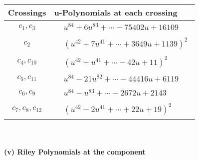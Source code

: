 \documentclass[1p]{elsarticle_modified}
\theoremstyle{definition}
\begin{document}
\begin{tabular}{m{50pt}|m{274pt}}
Crossings & \hspace{64pt}u-Polynomials at each crossing \\
\hline $$\begin{aligned}c_{1},c_{3}\end{aligned}$$&$\begin{aligned}
&u^{84}+6 u^{83}+\cdots-75402 u+16109
\end{aligned}$\\
\hline $$\begin{aligned}c_{2}\end{aligned}$$&$\begin{aligned}
&(u^{42}+7 u^{41}+\cdots+3649 u+1139)^{2}
\end{aligned}$\\
\hline $$\begin{aligned}c_{4},c_{10}\end{aligned}$$&$\begin{aligned}
&(u^{42}+u^{41}+\cdots-42 u+11)^{2}
\end{aligned}$\\
\hline $$\begin{aligned}c_{5},c_{11}\end{aligned}$$&$\begin{aligned}
&u^{84}-21 u^{82}+\cdots-44416 u+6119
\end{aligned}$\\
\hline $$\begin{aligned}c_{6},c_{9}\end{aligned}$$&$\begin{aligned}
&u^{84}- u^{83}+\cdots-2672 u+2143
\end{aligned}$\\
\hline $$\begin{aligned}c_{7},c_{8},c_{12}\end{aligned}$$&$\begin{aligned}
&(u^{42}-2 u^{41}+\cdots+22 u+19)^{2}
\end{aligned}$\\
\hline
\end{tabular}\\~\\
\newpage\renewcommand{\arraystretch}{1}
\flushleft \textbf{(v) Riley Polynomials at the component}\newline \\
\end{document}
